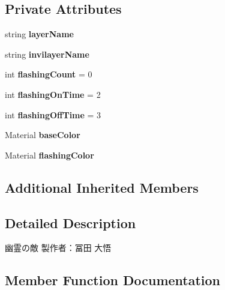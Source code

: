 \subsection*{Private Attributes}
\begin{DoxyCompactItemize}
\item 
\mbox{\label{class_phantom_ae0fee52252ee0c720ae3b072b12ae5ff}} 
string {\bfseries layer\+Name}
\item 
\mbox{\label{class_phantom_a2e48fb4e245704445aea1be548c1566c}} 
string {\bfseries invilayer\+Name}
\item 
\mbox{\label{class_phantom_a6549e563ad24667a44e4ce7d297e0b98}} 
int {\bfseries flashing\+Count} = 0
\item 
\mbox{\label{class_phantom_a23114dec2476a7d494e2e2582d27d455}} 
int {\bfseries flashing\+On\+Time} = 2
\item 
\mbox{\label{class_phantom_a03205c4617dd8b686076a75be3a646b9}} 
int {\bfseries flashing\+Off\+Time} = 3
\item 
\mbox{\label{class_phantom_a38167a79c3c8b7a58f464dfa50ff223c}} 
Material {\bfseries base\+Color}
\item 
\mbox{\label{class_phantom_a2fc361fd996d2cb67826de4a6e2b0724}} 
Material {\bfseries flashing\+Color}
\end{DoxyCompactItemize}
\subsection*{Additional Inherited Members}


\subsection{Detailed Description}
幽霊の敵 製作者：冨田 大悟 



\subsection{Member Function Documentation}
\mbox{\label{class_phantom_ab639a11fe75cb4bce641d5bd52601fae}} 
